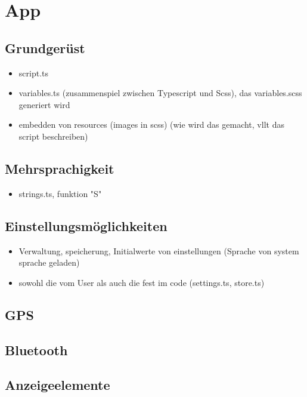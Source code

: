 \section{App}

\subsection{Grundgerüst}

\begin{itemize}
\item script.ts
\item variables.ts (zusammenspiel zwischen Typescript und Scss), das variables.scss generiert wird
\item embedden von resources (images in scss) (wie wird das gemacht, vllt das script beschreiben)
\end{itemize}

\subsection{Mehrsprachigkeit}

\begin{itemize}
\item strings.ts, funktion "S"
\end{itemize}

\subsection{Einstellungsmöglichkeiten}
\begin{itemize}
\item Verwaltung, speicherung, Initialwerte von einstellungen (Sprache von system sprache geladen)
\item sowohl die vom User als auch die fest im code (settings.ts, store.ts)
\end{itemize}

\subsection{GPS}

\subsection{Bluetooth}

\subsection{Anzeigeelemente}

